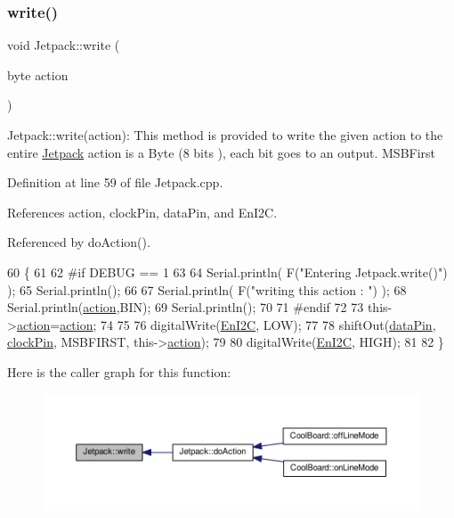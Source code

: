 \subsubsection{\texorpdfstring{write()}{write()}}
{\footnotesize\ttfamily void Jetpack\+::write (\begin{DoxyParamCaption}\item[{byte}]{action }\end{DoxyParamCaption})}

Jetpack\+::write(action)\+: This method is provided to write the given action to the entire \hyperlink{classJetpack}{Jetpack} action is a Byte (8 bits ), each bit goes to an output. M\+S\+B\+First 

Definition at line 59 of file Jetpack.\+cpp.



References action, clock\+Pin, data\+Pin, and En\+I2C.



Referenced by do\+Action().


\begin{DoxyCode}
60 \{
61 
62 \textcolor{preprocessor}{#if DEBUG == 1}
63 
64     Serial.println( F(\textcolor{stringliteral}{"Entering Jetpack.write()"}) );
65     Serial.println();
66 
67     Serial.println( F(\textcolor{stringliteral}{"writing this action : "}) );
68     Serial.println(\hyperlink{classJetpack_aca3142925a7b0834b34ae91d26af7765}{action},BIN);
69     Serial.println();
70 
71 \textcolor{preprocessor}{#endif }
72 
73     this->\hyperlink{classJetpack_aca3142925a7b0834b34ae91d26af7765}{action}=\hyperlink{classJetpack_aca3142925a7b0834b34ae91d26af7765}{action};
74 
75     
76     digitalWrite(\hyperlink{classJetpack_a81df984fb4cea98c71aa1a1cfcdfe814}{EnI2C}, LOW);
77     
78     shiftOut(\hyperlink{classJetpack_a3d669a56e93c71dd25f970d4ed7d0c00}{dataPin}, \hyperlink{classJetpack_a58ebb991f358f3ae94e82148b0221b5a}{clockPin}, MSBFIRST, this->\hyperlink{classJetpack_aca3142925a7b0834b34ae91d26af7765}{action});
79 
80     digitalWrite(\hyperlink{classJetpack_a81df984fb4cea98c71aa1a1cfcdfe814}{EnI2C}, HIGH);
81 
82 \}   
\end{DoxyCode}
Here is the caller graph for this function\+:\nopagebreak
\begin{figure}[H]
\begin{center}
\leavevmode
\includegraphics[width=350pt]{classJetpack_a338f1af8cbc6504ac69b47c7328569b5_icgraph}
\end{center}
\end{figure}
\mbox{\label{classJetpack_a79ae7bc3c1828a0551a7c005c4f8bd00}} 
